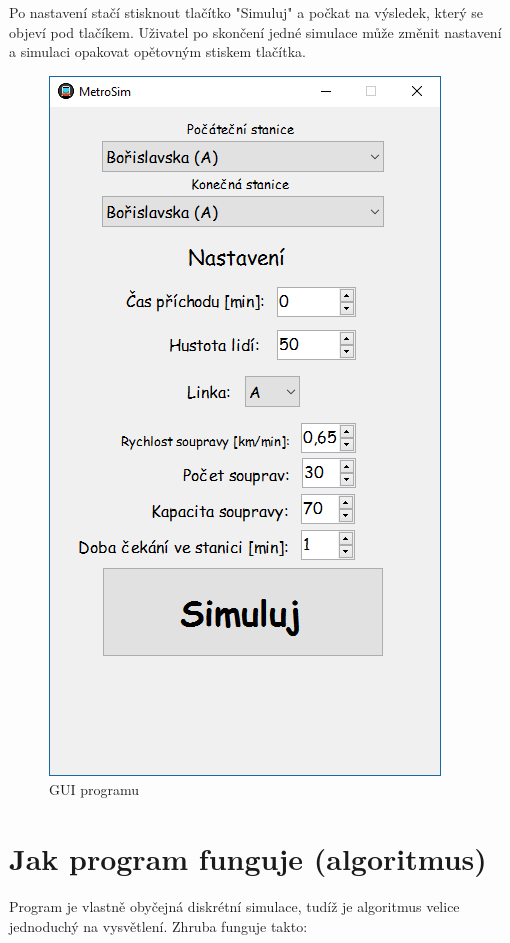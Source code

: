 \documentclass[12pt, a4paper]{article}
\begin{document}
Po nastavení stačí stisknout tlačítko "Simuluj" a počkat na výsledek, který se objeví pod tlačíkem. Uživatel po skončení jedné simulace může změnit nastavení a simulaci opakovat opětovným stiskem tlačítka.
\begin{figure}[h]
\centering
\includegraphics[scale=0.5]{obr1}
\caption{GUI programu}
\end{figure}

\section{Jak program funguje (algoritmus)}

Program je vlastně obyčejná diskrétní simulace, tudíž je algoritmus velice jednoduchý na vysvětlení. Zhruba funguje takto:
\end{document}
